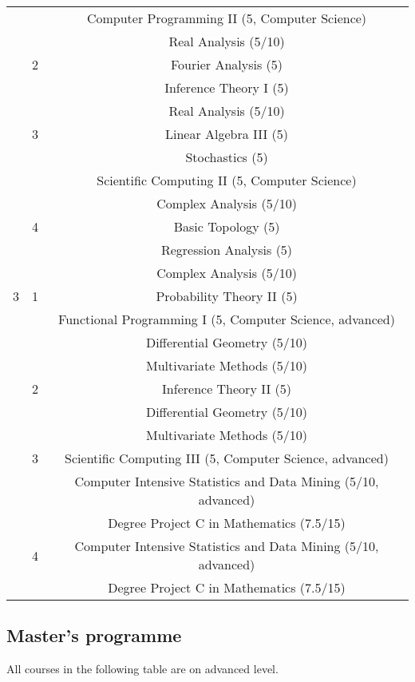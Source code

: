 \documentclass{article}
\begin{document}
\begin{longtable}{|c|c|c|}
      &   & Computer Programming II (5, Computer Science) \\
      &   & Real Analysis (5/10) \\
    \hline
      & 2 & Fourier Analysis (5) \\
      &   & Inference Theory I (5) \\
      &   & Real Analysis (5/10) \\
    \hline
      & 3 & Linear Algebra III (5) \\
      &   & Stochastics (5) \\
      &   & Scientific Computing II (5, Computer Science) \\
      &   & Complex Analysis (5/10) \\
    \hline
      & 4 & Basic Topology (5) \\
      &   & Regression Analysis (5) \\
      &   & Complex Analysis (5/10) \\
    \hline
    3 & 1 & Probability Theory II (5) \\
      &   & Functional Programming I (5, Computer Science, advanced) \\
      &   & Differential Geometry (5/10) \\
      &   & Multivariate Methods (5/10) \\
    \hline
      & 2 & Inference Theory II (5) \\
      &   & Differential Geometry (5/10) \\
      &   & Multivariate Methods (5/10) \\
    \hline
      & 3 & Scientific Computing III (5, Computer Science, advanced) \\
      &   & Computer Intensive Statistics and Data Mining (5/10, advanced) \\
      &   & Degree Project C in Mathematics (7.5/15) \\
    \hline
      & 4 & Computer Intensive Statistics and Data Mining (5/10, advanced) \\
      &   & Degree Project C in Mathematics (7.5/15) \\
    \hline
  \end{longtable}

  \subsection{Master's programme}

  All courses in the following table are on advanced level.
\end{document}
